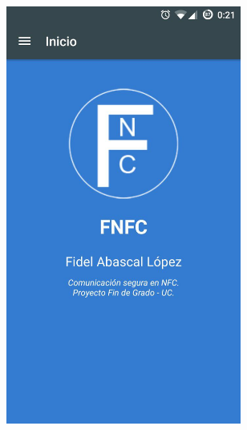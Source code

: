 \documentclass[../PFC.tex]{subfiles}
\begin{document}

\begin{figure}[H]
\centering
	\begin{subfigure}{0.4\textwidth}
		\centering
		\includegraphics[width=0.85\textwidth]{./img/pantallaPrincipal}
    \end{subfigure}          

\end{figure}
\end{document}
